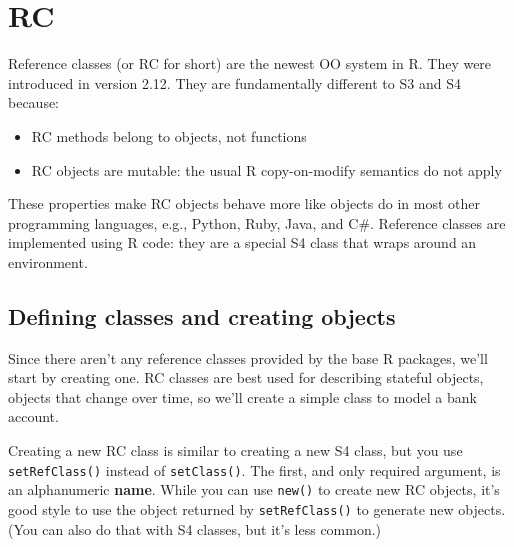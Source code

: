 \hypertarget{rc}{%
\section{RC}\label{rc}}

Reference classes (or RC for short) are the newest OO system in R. They
were introduced in version 2.12. They are fundamentally different to S3
and S4 because:  

\begin{itemize}
\item
  RC methods belong to objects, not functions
\item
  RC objects are mutable: the usual R copy-on-modify semantics do not
  apply
\end{itemize}

These properties make RC objects behave more like objects do in most
other programming languages, e.g., Python, Ruby, Java, and C\#.
Reference classes are implemented using R code: they are a special S4
class that wraps around an environment.

\hypertarget{defining-classes-and-creating-objects-2}{%
\subsection{Defining classes and creating
objects}\label{defining-classes-and-creating-objects-2}}

Since there aren't any reference classes provided by the base R
packages, we'll start by creating one. RC classes are best used for
describing stateful objects, objects that change over time, so we'll
create a simple class to model a bank account. 

Creating a new RC class is similar to creating a new S4 class, but you
use \texttt{setRefClass()} instead of \texttt{setClass()}. The first,
and only required argument, is an alphanumeric \textbf{name}. While you
can use \texttt{new()} to create new RC objects, it's good style to use
the object returned by \texttt{setRefClass()} to generate new objects.
(You can also do that with S4 classes, but it's less common.)

\begin{Shaded}
\begin{Highlighting}[]
\StringTok{ }\NormalTok{(}\NormalTok{)}
\OperatorTok{$}\NormalTok{()}
\end{Highlighting}
\end{Shaded}

